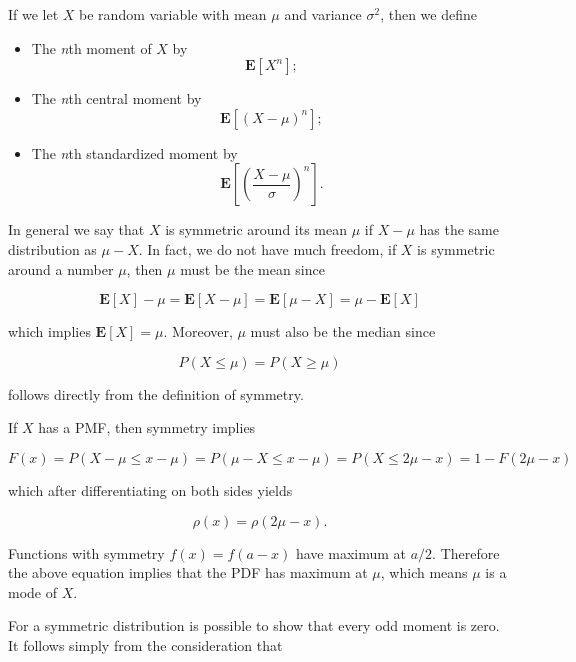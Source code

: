\documentclass[12pt]{article}
\begin{document}
If we let $X$ be random variable with mean $\mu$ and variance $\sigma^{2}$, 
then we define

\begin{itemize}
\item The \textit{n}th moment of $X$ by \[ \mathbf{E}[ X^{n} ]; \]

\item The \textit{n}th central moment by \[ \mathbf{E} [ (X - \mu)^{n} ]; \]

\item The \textit{n}th standardized moment by \[ \mathbf{E} \left[ \left( \frac{X - \mu}{\sigma} \right)^{n}  \right].  \]
\end{itemize}

In general we say that $X$ is symmetric around its mean $\mu$ if $X - \mu$ has the same distribution
as $\mu - X$. In fact, we do not have much freedom, if $X$ is symmetric around a number $\mu$, then 
$\mu$ must be the mean since

\begin{equation}
\mathbf{E} [ X ] - \mu = \mathbf{E} [ X - \mu ] = \mathbf{E} [ \mu - X ] = \mu - \mathbf{E} [ X ]
\end{equation}

\noindent
which implies $\mathbf{E} [ X ] = \mu$.
Moreover, $\mu$ must also be the median since

\begin{equation}
P( X \leq \mu ) = P ( X \geq \mu)
\end{equation}

\noindent
follows directly from the definition of symmetry.

If $X$ has a PMF, then symmetry implies

\begin{equation}
F(x) = P ( X - \mu \leq x - \mu ) = 
P ( \mu - X \leq x - \mu ) = P( X \leq 2\mu - x) = 1 - F(2 \mu - x )
\end{equation}

\noindent
which after differentiating on both sides yields

\begin{equation}
\rho(x) = \rho( 2 \mu - x).
\end{equation}

\noindent
Functions with symmetry $f(x) = f(a - x)$ have maximum at $a/2$.
Therefore the above equation implies that the PDF has maximum at $\mu$,
which means $\mu$ is a mode of $X$.

For a symmetric distribution is possible to show that every odd
moment is zero. It follows simply from the consideration that
\end{document}
